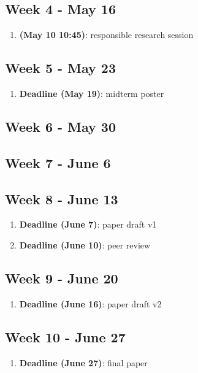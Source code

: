 \documentclass[english]{article}
\begin{document}
\subsection*{Week 4 - May 16}
\begin{enumerate}
\item \textbf{(May 10 10:45)}: responsible research session
\end{enumerate}

\subsection*{Week 5 - May 23}
\begin{enumerate}
\item \textbf{Deadline (May 19)}: midterm poster
\end{enumerate}

\subsection*{Week 6 - May 30}

\subsection*{Week 7 - June 6}

\subsection*{Week 8 - June 13}
\begin{enumerate}
\item \textbf{Deadline (June 7)}: paper draft v1
\item \textbf{Deadline (June 10)}: peer review
\end{enumerate}

\subsection*{Week 9 - June 20}
\begin{enumerate}
\item \textbf{Deadline (June 16)}: paper draft v2
\end{enumerate}

\subsection*{Week 10 - June 27}
\begin{enumerate}
\item \textbf{Deadline (June 27)}: final paper
\end{enumerate}
\end{document}

